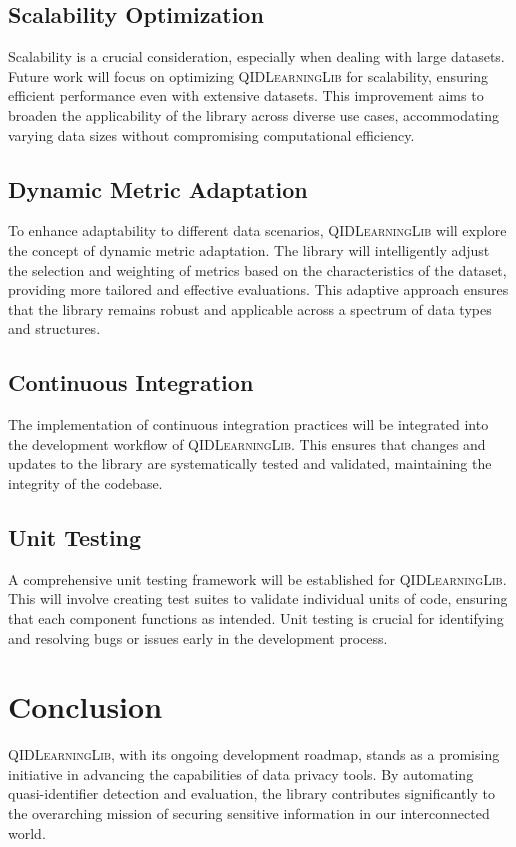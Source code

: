 \documentclass[twoside,11pt]{article}
\begin{document}
\subsection{Scalability Optimization}
Scalability is a crucial consideration, especially when dealing with large datasets. Future work will focus on optimizing \textsc{QIDLearningLib} for scalability, ensuring efficient performance even with extensive datasets. This improvement aims to broaden the applicability of the library across diverse use cases, accommodating varying data sizes without compromising computational efficiency.

\subsection{Dynamic Metric Adaptation}
To enhance adaptability to different data scenarios, \textsc{QIDLearningLib} will explore the concept of dynamic metric adaptation. The library will intelligently adjust the selection and weighting of metrics based on the characteristics of the dataset, providing more tailored and effective evaluations. This adaptive approach ensures that the library remains robust and applicable across a spectrum of data types and structures.

\subsection{Continuous Integration}
The implementation of continuous integration practices will be integrated into the development workflow of \textsc{QIDLearningLib}. This ensures that changes and updates to the library are systematically tested and validated, maintaining the integrity of the codebase.

\subsection{Unit Testing}
A comprehensive unit testing framework will be established for \textsc{QIDLearningLib}. This will involve creating test suites to validate individual units of code, ensuring that each component functions as intended. Unit testing is crucial for identifying and resolving bugs or issues early in the development process.


\section{Conclusion}
\textsc{QIDLearningLib}, with its ongoing development roadmap, stands as a promising initiative in advancing the capabilities of data privacy tools. By automating quasi-identifier detection and evaluation, the library contributes significantly to the overarching mission of securing sensitive information in our interconnected world.
\end{document}
